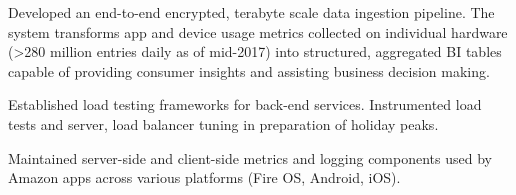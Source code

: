 \documentclass[]{deedy-resume-openfont}
\begin{document}
\begin{minipage}[t]{0.64\textwidth}
\minigap
{}
\minigap
\begin{tightemize}
\item Developed an end-to-end encrypted, terabyte scale data ingestion pipeline. The system transforms app and device usage metrics collected on individual hardware (>280 million entries daily as of mid-2017) into structured, aggregated BI tables capable of providing consumer insights and assisting business decision making.
\item Established load testing frameworks for back-end services. Instrumented load tests and server, load balancer tuning in preparation of holiday peaks.
\item Maintained server-side and client-side metrics and logging components used by Amazon apps across various platforms (Fire OS, Android, iOS).
\end{tightemize}
\sectionsep





\end{minipage}
\end{document}
